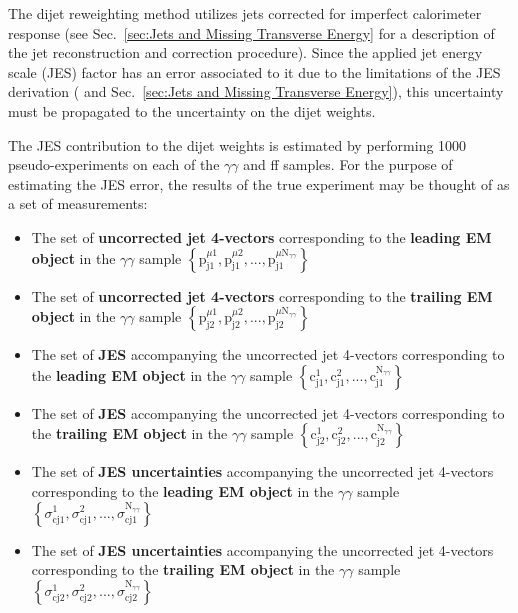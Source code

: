 \documentclass[dissertation.tex]{subfiles}
\begin{document}
The dijet \pT reweighting method utilizes jets corrected for imperfect calorimeter response (see Sec.~\ref{sec:Jets and Missing Transverse Energy} for a description of the jet reconstruction and correction procedure).  Since the applied jet energy scale (JES) factor has an error associated to it due to the limitations of the JES derivation (\cite{CMS_JES_paper} and Sec.~\ref{sec:Jets and Missing Transverse Energy}), this uncertainty must be propagated to the uncertainty on the dijet \pT weights.

The JES contribution to the dijet \pT weights is estimated by performing 1000 pseudo-experiments on each of the $\gamma\gamma$ and ff samples.  For the purpose of estimating the JES error, the results of the true experiment may be thought of as a set of measurements:

\begin{itemize}
  \item The set of \textbf{uncorrected jet 4-vectors} corresponding to the \textbf{leading EM object} in the $\gamma\gamma$ sample $\left\{\mbox{p}_{\mbox{j}1}^{\mu1}, \mbox{p}_{\mbox{j}1}^{\mu2},...,\mbox{p}_{\mbox{j}1}^{\mu \mbox{N}_{\gamma\gamma}}\right\}$
  \item The set of \textbf{uncorrected jet 4-vectors} corresponding to the \textbf{trailing EM object} in the $\gamma\gamma$ sample $\left\{\mbox{p}_{\mbox{j}2}^{\mu1}, \mbox{p}_{\mbox{j}2}^{\mu2},...,\mbox{p}_{\mbox{j}2}^{\mu \mbox{N}_{\gamma\gamma}}\right\}$
  \item The set of \textbf{JES} accompanying the uncorrected jet 4-vectors corresponding to the \textbf{leading EM object} in the $\gamma\gamma$ sample $\left\{\mbox{c}_{\mbox{j}1}^{1}, \mbox{c}_{\mbox{j}1}^{2},...,\mbox{c}_{\mbox{j}1}^{\mbox{N}_{\gamma\gamma}}\right\}$
  \item The set of \textbf{JES} accompanying the uncorrected jet 4-vectors corresponding to the \textbf{trailing EM object} in the $\gamma\gamma$ sample $\left\{\mbox{c}_{\mbox{j}2}^{1}, \mbox{c}_{\mbox{j}2}^{2},...,\mbox{c}_{\mbox{j}2}^{\mbox{N}_{\gamma\gamma}}\right\}$
  \item The set of \textbf{JES uncertainties} accompanying the uncorrected jet 4-vectors corresponding to the \textbf{leading EM object} in the $\gamma\gamma$ sample $\left\{\sigma_{\mbox{cj}1}^{1}, \sigma_{\mbox{cj}1}^{2},...,\sigma_{\mbox{cj}1}^{\mbox{N}_{\gamma\gamma}}\right\}$
  \item The set of \textbf{JES uncertainties} accompanying the uncorrected jet 4-vectors corresponding to the \textbf{trailing EM object} in the $\gamma\gamma$ sample $\left\{\sigma_{\mbox{cj}2}^{1}, \sigma_{\mbox{cj}2}^{2},...,\sigma_{\mbox{cj}2}^{\mbox{N}_{\gamma\gamma}}\right\}$

\end{itemize}
\end{document}

